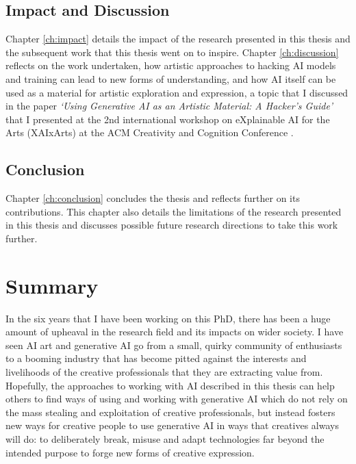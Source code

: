 \subsection{Impact and Discussion}

Chapter \ref{ch:impact} details the impact of the research presented in this thesis and the subsequent work that this thesis went on to inspire. Chapter \ref{ch:discussion} reflects on the work undertaken, how artistic approaches to hacking AI models and training can lead to new forms of understanding, and how AI itself can be used as a material for artistic exploration and expression, a topic that I discussed in the paper \textit{`Using Generative AI as an Artistic Material: A Hacker's Guide'} that I presented at the 2nd international workshop on eXplainable AI for the Arts (XAIxArts) at the ACM Creativity and Cognition Conference \citep{broad2024using}.

\subsection{Conclusion}

Chapter \ref{ch:conclusion} concludes the thesis and reflects further on its contributions.
This chapter also details the limitations of the research presented in this thesis and discusses possible future research directions to take this work further.

\section{Summary}

In the six years that I have been working on this PhD, there has been a huge amount of upheaval in the research field and its impacts on wider society. 
I have seen AI art and generative AI go from a small, quirky community of enthusiasts to a booming industry that has become pitted against the interests and livelihoods of the creative professionals that they are extracting value from.
Hopefully, the approaches to working with AI described in this thesis can help others to find ways of using and working with generative AI which do not rely on the mass stealing and exploitation of creative professionals, but instead fosters new ways for creative people to use generative AI in ways that creatives always will do: to deliberately break, misuse and adapt technologies far beyond the intended purpose to forge new forms of creative expression.
